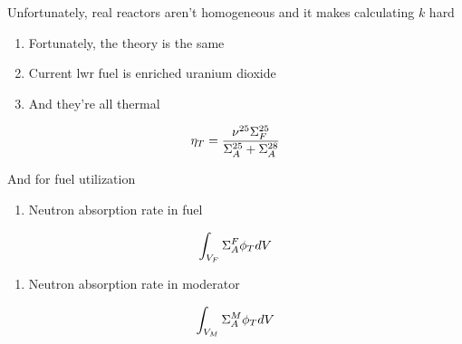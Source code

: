 \documentclass[aspectratio=1610,pdftex,dvipsnames,compress,xcolor={dvipsnames}]{beamer}
\newcommand{\acs}{\acrshort} %
\begin{document}
\addtocounter{framenumber}{-1} 
\begin{frame}{Unfortunately, real reactors aren't homogeneous and it makes calculating $k$ hard}
    \begin{enumerate}[series=outerlist,topsep=0pt,itemsep=21pt,leftmargin=*,label=(\arabic*)]
        \item[]Fortunately, the theory is the same
        \item[]Current \acs{lwr} fuel is enriched uranium dioxide
        \item[]And they're all thermal
    \end{enumerate}

    \vspace*{\fill}

    \begin{equation}
        \LARGE
        \eta_T = \frac{\nu^{25}\Sigma_F^{25}}{\Sigma_A^{25}+\Sigma_A^{28}}
    \end{equation}
\end{frame}


\begin{frame}{And for fuel utilization}
    \begin{enumerate}[series=outerlist,topsep=0pt,itemsep=21pt,leftmargin=*,label=(\arabic*)]
        \item[]Neutron absorption rate in fuel
    \end{enumerate}

    \vspace*{\fill}

    \begin{equation}
        \LARGE
        \int_{V_F} \Sigma_A^F \phi_T dV
    \end{equation}

    \vspace*{\fill}

    \begin{enumerate}[series=outerlist,topsep=0pt,itemsep=21pt,leftmargin=*,label=(\arabic*)]
        \item[]Neutron absorption rate in moderator
    \end{enumerate}

    \vspace*{\fill}

    \begin{equation}
        \LARGE
        \int_{V_M} \Sigma_A^M \phi_T dV
    \end{equation}
\end{frame}
\end{document}
